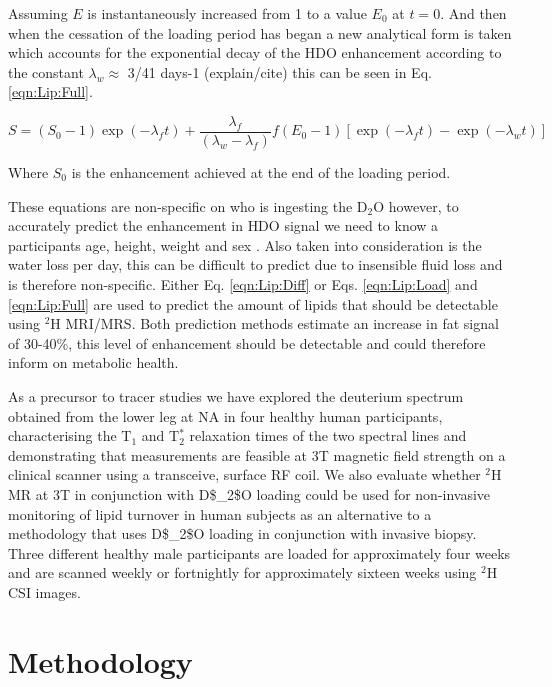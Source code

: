 Assuming $E$ is instantaneously increased from 1 to a value $E_0$ at $t=0$. And then when the cessation of the loading period has began a new analytical form is taken which accounts for the exponential decay of the HDO enhancement according to the constant $\lambda_w \approx$ 3/41 days-1 (explain/cite) this can be seen in Eq. \ref{eqn:Lip:Full}.

\begin{equation}
    S = (S_0 - 1)\exp(-\lambda_ft)+\frac{\lambda_f}{(\lambda_w - \lambda_f)}f(E_0 - 1)[\exp(-\lambda_ft)-\exp(-\lambda_wt)]
    \label{eqn:Lip:Full}
\end{equation}

Where $S_0$ is the enhancement achieved at the end of the loading period.

These equations are non-specific on who is ingesting the D$_2$O however, to accurately predict the enhancement in \ac{HDO} signal we need to know a participants age, height, weight and sex \cite{Watson1980TotalMeasurements}. Also taken into consideration is the water loss per day, this can be difficult to predict due to insensible fluid loss and is therefore non-specific. Either Eq. \ref{eqn:Lip:Diff} or Eqs. \ref{eqn:Lip:Load} and \ref{eqn:Lip:Full} are used to predict the amount of lipids that should be detectable using $^2$H \ac{MRI}/\ac{MRS}. Both prediction methods estimate an increase in fat signal of 30-40\%, this level of enhancement should be detectable and could therefore inform on metabolic health. 

As a precursor to tracer studies we have explored the deuterium spectrum obtained from the lower leg at \ac{NA} in four healthy human participants, characterising the T$_1$ and T$_2^*$ relaxation times of the two spectral lines and demonstrating that measurements are feasible at 3T magnetic field strength on a clinical scanner using a transceive, surface \ac{RF} coil. We also evaluate whether $^2$H MR at 3T in conjunction with \ac{D$_2$O} loading could be used for non-invasive monitoring of lipid turnover in human subjects as an alternative to a methodology that uses \ac{D$_2$O} loading in conjunction with invasive biopsy. Three different healthy male participants are loaded for approximately four weeks and are scanned weekly or fortnightly for approximately sixteen weeks using $^2$H \ac{CSI} images.

\section{Methodology}

